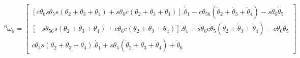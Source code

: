 \begin{equation}
\begin{gathered}
    ^6\omega_6 = \begin{bmatrix}
        [c\theta_6s\theta_5s(\theta_2+\theta_3+\theta_4) + s\theta_6c(\theta_2+\theta_3+\theta_4)].\dot{\theta}_1 - c\theta_{56}(\dot{\theta}_2 + \dot{\theta}_3 + \dot{\theta}_4) - s\theta_6\dot{\theta}_5 \\
        [-s\theta_{56}s(\theta_2+\theta_3+\theta_4) + c\theta_6c(\theta_2+\theta_3+\theta_4)].\dot{\theta}_1 + s\theta_6c\theta_5(\dot{\theta}_2 + \dot{\theta}_3 + \dot{\theta}_4) - c\theta_6\dot{\theta}_5 \\ 
        c\theta_5s(\theta_2+\theta_3+\theta_4).\dot{\theta}_1 + s\theta_5(\dot{\theta}_2 + \dot{\theta}_3 + \dot{\theta}_4) + \dot{\theta}_6
    \end{bmatrix}
\end{gathered}
\end{equation}

